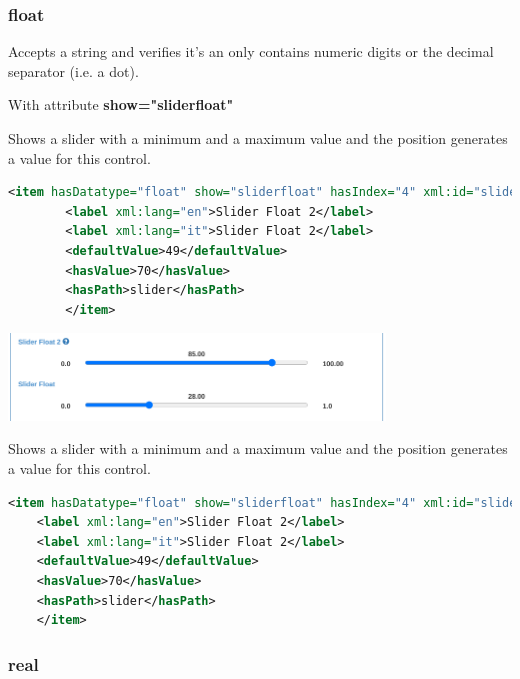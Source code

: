 \documentclass[10pt]{article}
\begin{document}
\subsubsection{float}
\label{real}

Accepts a string and verifies it's an only contains numeric digits or the decimal separator (i.e. a dot).

\begin{mdframed}
	With attribute \textbf{show="sliderfloat"}
	
	Shows a slider with a minimum and a maximum value and the position generates a value for this control.
	
	\begin{lstlisting}[language=xml]
		<item hasDatatype="float" show="sliderfloat" hasIndex="4" xml:id="slider2" isFixed="false" min="0.0" max="100.00" step="0.5">
		<label xml:lang="en">Slider Float 2</label>
		<label xml:lang="it">Slider Float 2</label>
		<defaultValue>49</defaultValue>
		<hasValue>70</hasValue>
		<hasPath>slider</hasPath>
		</item>
	\end{lstlisting}
	
	
	{\centering
		\includegraphics[width=10cm]{FloatSlider.png}
		\par
	}
	
	
\end{mdframed}


Shows a slider with a minimum and a maximum value and the position generates a value for this control.

\begin{lstlisting}[language=xml]
	<item hasDatatype="float" show="sliderfloat" hasIndex="4" xml:id="slider2" isFixed="false" min="0.0" max="100.00" step="0.5">
	<label xml:lang="en">Slider Float 2</label>
	<label xml:lang="it">Slider Float 2</label>
	<defaultValue>49</defaultValue>
	<hasValue>70</hasValue>
	<hasPath>slider</hasPath>
	</item>
\end{lstlisting}


\subsubsection{real}
\label{double}
\end{document}
